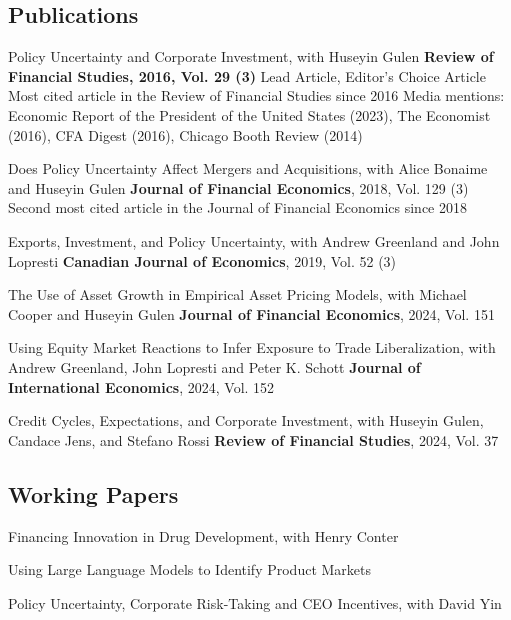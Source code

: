 \documentclass[10pt,letterpaper]{article}
\renewenvironment{itemize}{
  \begin{list}{}{
    \setlength{\leftmargin}{1.5em}
    \setlength{\itemsep}{0.25em}
    \setlength{\parskip}{0pt}
    \setlength{\parsep}{0.25em}
  }
}{
  \end{list}
}
\begin{document}
\subsection*{Publications}
\begin{itemize}

\item Policy Uncertainty and Corporate Investment, with Huseyin Gulen
\subitem \textbf{Review of Financial Studies, 2016, Vol. 29 (3)}
\subitem Lead Article, Editor's Choice Article
\subitem Most cited article in the Review of Financial Studies since 2016
\subitem Media mentions: Economic Report of the President of the United States (2023), The Economist (2016), CFA Digest (2016), Chicago Booth Review (2014)
\medskip
\item Does Policy Uncertainty Affect Mergers and Acquisitions, with Alice Bonaime and Huseyin Gulen
\subitem \textbf{Journal of Financial Economics}, 2018, Vol. 129 (3)
\subitem Second most cited article in the Journal of Financial Economics since 2018
\medskip
\item Exports, Investment, and Policy Uncertainty, with Andrew Greenland and John Lopresti
\subitem \textbf{Canadian Journal of Economics}, 2019, Vol. 52 (3)
\medskip
\item The Use of Asset Growth in Empirical Asset Pricing Models, with Michael Cooper and Huseyin Gulen 
  \subitem \textbf{Journal of Financial Economics}, 2024, Vol. 151
\medskip
\item Using Equity Market Reactions to Infer Exposure to Trade Liberalization, with Andrew Greenland, John Lopresti and Peter K. Schott  
  \subitem \textbf{Journal of International Economics}, 2024, Vol. 152
\medskip
\item Credit Cycles, Expectations, and Corporate Investment, with Huseyin Gulen, Candace Jens, and Stefano Rossi 
  \subitem \textbf{Review of Financial Studies}, 2024, Vol. 37
\end{itemize}

\subsection*{Working Papers}
\begin{itemize}



\medskip
\item Financing Innovation in Drug Development, with Henry Conter
\medskip
\item Using Large Language Models to Identify Product Markets
\medskip
\item Policy Uncertainty, Corporate Risk-Taking and CEO Incentives, with David Yin
\end{itemize}
\end{document}
